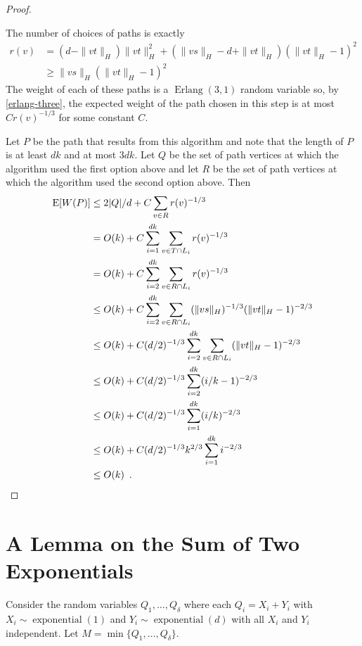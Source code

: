 \documentclass[lotsofwhite]{patmorin}
\DeclareMathOperator{\exponential}{exponential}
\DeclareMathOperator{\erlang}{Erlang}
\begin{document}
\begin{proof}
\begin{enumerate}
    The number of choices of paths is exactly
    \begin{align*}
        r(v) & = (d-\|vt\|_H)\|vt\|_H^2 
               + (\|vs\|_H-d+\|vt\|_H)(\|vt\|_H-1)^2 \\
             & \ge \|vs\|_H(\|vt\|_H-1)^2
    \end{align*}
    The weight of each of these paths is a
    $\erlang(3,1)$ random variable so, by \eqref{erlang-three}, the expected weight of the path
    chosen in this step is at most $Cr(v)^{-1/3}$ for some constant $C$.
\end{enumerate}
Let $P$ be the path that results from this algorithm and note that the
length of $P$ is at least $dk$ and at most $3dk$.  Let $Q$ be the set of
path vertices at which the algorithm used the first option above and let
$R$ be the set of path vertices at which the algorithm used the second
option above.  Then
\begin{align*}
    \mathrm{E}[W(P)] & \le 2|Q|/d + C\sum_{v\in R}r(v)^{-1/3} \\
             & = O(k) + C\sum_{i=1}^{dk}\sum_{v\in T\cap L_i}r(v)^{-1/3} \\
             & = O(k) + C\sum_{i=2}^{dk}\sum_{v\in R\cap L_i}r(v)^{-1/3} \\
             & \le O(k) + C\sum_{i=2}^{dk}\sum_{v\in R\cap L_i}(\|vs\|_H)^{-1/3}(\|vt\|_H-1)^{-2/3} \\
             & \le O(k) + C(d/2)^{-1/3}\sum_{i=2}^{dk}\sum_{v\in R\cap L_i}(\|vt\|_H-1)^{-2/3} \\
             & \le O(k) +  C(d/2)^{-1/3}\sum_{i=2}^{dk}(i/k-1)^{-2/3} \\
             & \le O(k) +  C(d/2)^{-1/3}\sum_{i=1}^{dk}(i/k)^{-2/3} \\
             & \le O(k) +  C(d/2)^{-1/3}k^{2/3}\sum_{i=1}^{dk}i^{-2/3} \\
             & \le O(k) \enspace . \qedhere
\end{align*}
\end{proof}

\section{A Lemma on the Sum of Two Exponentials}

Consider the random variables $Q_1,\ldots,Q_\delta$ where each
$Q_i=X_i+Y_i$ with $X_i\sim\exponential(1)$ and $Y_i\sim\exponential(d)$
with all $X_i$ and $Y_i$ independent.  Let $M=\min\{Q_1,\ldots,Q_\delta\}$.
\end{document}

